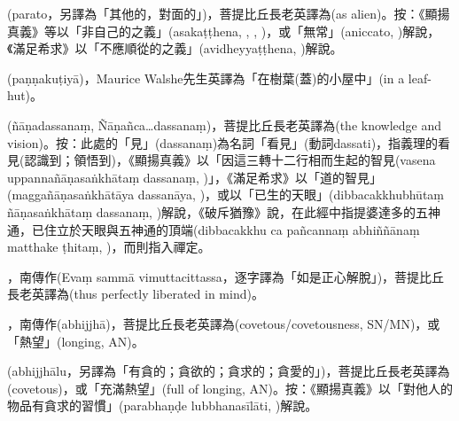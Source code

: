 \startitemgroup[noteitems]
\item{}(parato，另譯為「其他的，對面的」)，菩提比丘長老英譯為(as alien)。按：《顯揚真義》等以「非自己的之義」(asakaṭṭhena, , , )，或「無常」(aniccato, )解說，《滿足希求》以「不應順從的之義」(avidheyyaṭṭhena, )解說。
\stopitemgroup

\startitemgroup[noteitems]
\item{}(paṇṇakuṭiyā)，Maurice Walshe先生英譯為「在樹葉(蓋)的小屋中」(in a leaf-hut)。
\stopitemgroup

\startitemgroup[noteitems]
\item{}(ñāṇadassanaṃ, Ñāṇañca…dassanaṃ)，菩提比丘長老英譯為(the knowledge and vision)。按：此處的「見」(dassanaṃ)為名詞「看見」(動詞dassati)，指義理的看見(認識到；領悟到)，《顯揚真義》以「因這三轉十二行相而生起的智見(vasena uppannañāṇasaṅkhātaṃ dassanaṃ, )」，《滿足希求》以「道的智見」(maggañāṇasaṅkhātāya dassanāya, )，或以「已生的天眼」(dibbacakkhubhūtaṃ ñāṇasaṅkhātaṃ dassanaṃ, )解說，《破斥猶豫》說，在此經中指提婆達多的五神通，已住立於天眼與五神通的頂端(dibbacakkhu ca pañcannaṃ abhiññānaṃ matthake ṭhitaṃ, )，而則指入禪定。
\stopitemgroup

\startitemgroup[noteitems]
\item{}，南傳作(Evaṃ sammā vimuttacittassa，逐字譯為「如是正心解脫」)，菩提比丘長老英譯為(thus perfectly liberated in mind)。
\stopitemgroup

\startitemgroup[noteitems]
\item{}，南傳作(abhijjhā)，菩提比丘長老英譯為(covetous/covetousness, SN/MN)，或「熱望」(longing, AN)。
\item{}(abhijjhālu，另譯為「有貪的；貪欲的；貪求的；貪愛的」)，菩提比丘長老英譯為(covetous)，或「充滿熱望」(full of longing, AN)。按：《顯揚真義》以「對他人的物品有貪求的習慣」(parabhaṇḍe lubbhanasīlāti, )解說。
\stopitemgroup

